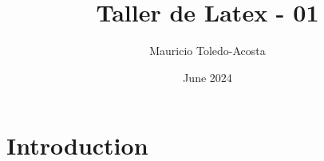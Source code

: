 \documentclass{article}
\title{Taller de Latex - 01}
\author{Mauricio Toledo-Acosta}
\date{June 2024}
\begin{document}
\maketitle

\section{Introduction}
\end{document}
